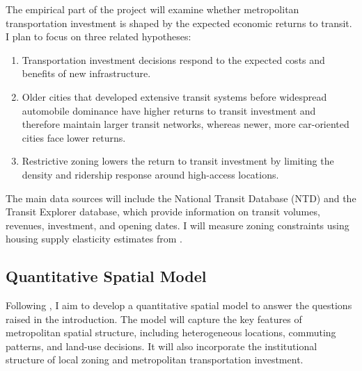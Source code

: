\documentclass[12pt, a4paper]{article}
\begin{document}
The empirical part of the project will examine whether metropolitan transportation investment is shaped by the expected economic returns to transit. I plan to focus on three related hypotheses:
\begin{enumerate}
    \item Transportation investment decisions respond to the expected costs and benefits of new infrastructure.
    \item Older cities that developed extensive transit systems before widespread automobile dominance have higher returns to transit investment and therefore maintain larger transit networks, whereas newer, more car-oriented cities face lower returns.
    \item Restrictive zoning lowers the return to transit investment by limiting the density and ridership response around high-access locations.
\end{enumerate}

The main data sources will include the National Transit Database (NTD) and the Transit Explorer database, which provide information on transit volumes, revenues, investment, and opening dates. I will measure zoning constraints using housing supply elasticity estimates from \textcite{Baum-Snow2024-ii}.

\subsection{Quantitative Spatial Model}
Following \citet{Severen2026-qx}, I aim to develop a quantitative spatial model to answer the questions raised in the introduction. The model will capture the key features of metropolitan spatial structure, including heterogeneous locations, commuting patterns, and land-use decisions. It will also incorporate the institutional structure of local zoning and metropolitan transportation investment.
\end{document}
